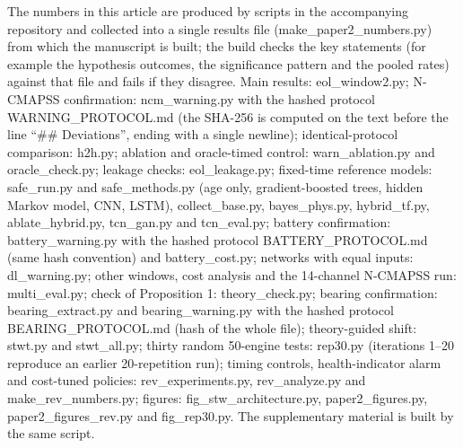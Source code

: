 \documentclass[11pt,a4paper]{article}
\begin{document}
\noindent The numbers in this article are produced by scripts in the accompanying repository and collected into a single results file (make\_paper2\_numbers.py) from which the manuscript is built; the build checks the key statements (for example the hypothesis outcomes, the significance pattern and the pooled rates) against that file and fails if they disagree. Main results: eol\_window2.py; N-CMAPSS confirmation: ncm\_warning.py with the hashed protocol WARNING\_PROTOCOL.md (the SHA-256 is computed on the text before the line ``\#\# Deviations'', ending with a single newline); identical-protocol comparison: h2h.py; ablation and oracle-timed control: warn\_ablation.py and oracle\_check.py;  leakage checks: eol\_leakage.py; fixed-time reference models: safe\_run.py and safe\_methods.py (age only, gradient-boosted trees, hidden Markov model, CNN, LSTM), collect\_base.py, bayes\_phys.py, hybrid\_tf.py, ablate\_hybrid.py, tcn\_gan.py and tcn\_eval.py; battery confirmation: battery\_warning.py with the hashed protocol BATTERY\_PROTOCOL.md (same hash convention) and battery\_cost.py; networks with equal inputs: dl\_warning.py; other windows, cost analysis and the 14-channel N-CMAPSS run: multi\_eval.py; check of Proposition 1: theory\_check.py; bearing confirmation: bearing\_extract.py and bearing\_warning.py with the hashed protocol BEARING\_PROTOCOL.md (hash of the whole file); theory-guided shift: stwt.py and stwt\_all.py; thirty random 50-engine tests: rep30.py (iterations 1--20 reproduce an earlier 20-repetition run); timing controls, health-indicator alarm and cost-tuned policies: rev\_experiments.py, rev\_analyze.py and make\_rev\_numbers.py; figures: fig\_stw\_architecture.py, paper2\_figures.py, paper2\_figures\_rev.py and fig\_rep30.py. The supplementary material is built by the same script.
\end{document}
